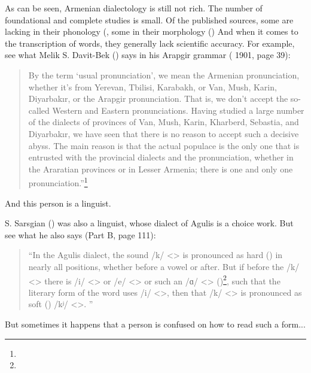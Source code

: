 As can be seen, Armenian dialectology is still not rich. The number of foundational and complete studies is small. Of the published sources, some are lacking in their phonology (, some in their morphology () And when it comes to the transcription of words, they generally lack scientific accuracy. For example, see what Melik S. Davit-Bek () says in his Arapgir grammar ( 1901, page 39): 

\begin{quote}
	By the term `usual pronunciation', we mean the Armenian pronunciation, whether it's from Yerevan, Tbilisi, Karabakh, or Van, Mush, Karin, Diyarbakır, or the Arapgir pronunciation. That is, we don't accept the so-called Western and Eastern pronunciations. Having studied a large number of the dialects of provinces of Van, Mush, Karin, Kharberd, Sebastia, and Diyarbakır, we have seen that there is no reason to accept such a decisive abyss. The main reason is that the actual populace is the only one that is entrusted with the provincial dialects and the pronunciation, whether in the Araratian provinces or in Lesser Armenia; there is one and only one pronunciation.''\footnote{}
\end{quote}


And this person is a linguist.

S. Sarsgian () was also a linguist, whose dialect of Agulis is a choice work. But see what he also says (Part B, page 111):

\begin{quote}
	``In the Agulis dialect, the sound /k/ <> is pronounced as hard () in nearly all positions, whether before a vowel or after. But if before the /k/ <> there is /i/ <> or /e/ <> or such an /ɑ/ <> ()\footnote{}, such that the literary form of the word uses /i/ <>, then that /k/ <> is pronounced as soft () /kʲ/ <>. '' 
\end{quote}


But sometimes it happens that a person is confused on how to read such a form... 

